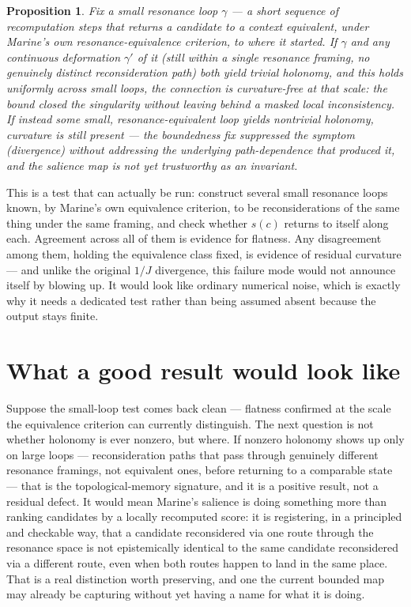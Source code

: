 \documentclass[11pt]{article}
\newtheorem{proposition}{Proposition}
\begin{document}
\begin{proposition}
Fix a small resonance loop $\gamma$ — a short sequence of recomputation steps that returns a candidate to a context equivalent, under Marine's own resonance-equivalence criterion, to where it started. If $\gamma$ and any continuous deformation $\gamma'$ of it (still within a single resonance framing, no genuinely distinct reconsideration path) both yield trivial holonomy, and this holds uniformly across small loops, the connection is curvature-free at that scale: the bound closed the singularity without leaving behind a masked local inconsistency. If instead some small, resonance-equivalent loop yields nontrivial holonomy, curvature is still present — the boundedness fix suppressed the symptom (divergence) without addressing the underlying path-dependence that produced it, and the salience map is not yet trustworthy as an invariant.
\end{proposition}

This is a test that can actually be run: construct several small resonance loops known, by Marine's own equivalence criterion, to be reconsiderations of the same thing under the same framing, and check whether $s(c)$ returns to itself along each. Agreement across all of them is evidence for flatness. Any disagreement among them, holding the equivalence class fixed, is evidence of residual curvature — and unlike the original $1/J$ divergence, this failure mode would not announce itself by blowing up. It would look like ordinary numerical noise, which is exactly why it needs a dedicated test rather than being assumed absent because the output stays finite.

\section{What a good result would look like}

Suppose the small-loop test comes back clean — flatness confirmed at the scale the equivalence criterion can currently distinguish. The next question is not whether holonomy is ever nonzero, but where. If nonzero holonomy shows up only on large loops — reconsideration paths that pass through genuinely different resonance framings, not equivalent ones, before returning to a comparable state — that is the topological-memory signature, and it is a positive result, not a residual defect. It would mean Marine's salience is doing something more than ranking candidates by a locally recomputed score: it is registering, in a principled and checkable way, that a candidate reconsidered via one route through the resonance space is not epistemically identical to the same candidate reconsidered via a different route, even when both routes happen to land in the same place. That is a real distinction worth preserving, and one the current bounded map may already be capturing without yet having a name for what it is doing.
\end{document}
